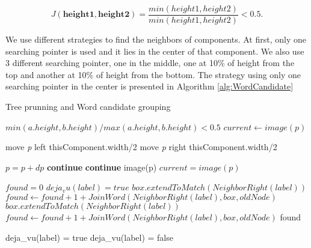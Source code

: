\begin{equation}
J(\mathbf{height1},\mathbf{height2}) = \dfrac{min(height1,height2)}{min(height1,height2)} < 0.5. 
\end{equation}


\par We use different strategies to find the neighbors of components. At first, only one searching pointer is used and it lies in the center of that component. We also use 3 different searching pointer, one in the middle, one at 10\% of height from the top and another at 10\% of height from the bottom. 
The strategy using only one searching pointer in the center is presented in Algorithm \ref{alg:WordCandidate} 

\begin{algorithm}
\caption{Tree prunning and Word candidate grouping}\label{alg:WordCandidate}
\begin{algorithmic}[1]
\State \Return $min(a.height,b.height)/max(a.height,b.height)<0.5$
\EndProcedure
{}
\State $current \gets image(p)$

	\State move \textit{p} left thisComponent.width/2
\Else
	\State move \textit{p} right thisComponent.width/2
\EndIf

\State $p=p+dp$
 \textbf{continue} \EndIf
{} \textbf{continue} \EndIf
{}
	\State \Return image(p)
\Else
	\State $current = image(p)$
\EndIf
\EndFor
\State {}
\EndProcedure
\item[]
\item[]
	\State $found = 0$
	\State $deja_vu(label)= true$	
		\State $box.extendToMatch(NeighborRight(label))$
		\State $found \gets found + 1 + JoinWord(NeighborRight(label),box,oldNode)$
	\EndIf
		\State $box.extendToMatch(NeighborRight(label))$
		\State $found \gets found + 1 + JoinWord(NeighborRight(label),box,oldNode)$	
	\EndIf
	\State \Return found
\EndFunction
\item[]
\item[]
		\State	deja\_vu(label) = true
	\Else
		\State	deja\_vu(label) = false
	\EndIf
\EndFor


\end{algorithmic}
\end{algorithm}
